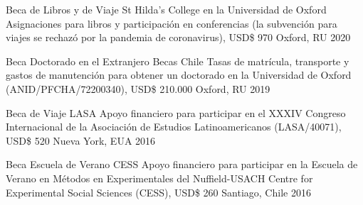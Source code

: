 





\vspace{1mm}

\begin{cvhonors}
\cvhonor
{Beca de Libros y de Viaje St Hilda's College en la Universidad de Oxford} 
{Asignaciones para libros y participación en conferencias (la subvención para viajes se rechazó por la pandemia de coronavirus), USD{\$} 970} 
{Oxford, RU}
{2020}
\end{cvhonors}

\vspace{1mm}

\begin{cvhonors}
\cvhonor
{Beca Doctorado en el Extranjero Becas Chile} 
{Tasas de matrícula, transporte y gastos de manutención para obtener un doctorado en la Universidad de Oxford (ANID/PFCHA/72200340), USD{\$} 210.000}
{Oxford, RU}
{2019}
\end{cvhonors}

\vspace{1mm}

\begin{cvhonors}
\cvhonor
{Beca de Viaje LASA} 
{Apoyo financiero para participar en el XXXIV Congreso Internacional de la Asociación de Estudios Latinoamericanos (LASA/40071), USD{\$} 520}
{Nueva York, EUA}
{2016}
\end{cvhonors}

\vspace{1mm}

\begin{cvhonors}
\cvhonor
{Beca Escuela de Verano CESS}
{Apoyo financiero para participar en la Escuela de Verano en Métodos en Experimentales del Nuffield-USACH Centre for Experimental Social Sciences (CESS), USD{\$} 260}
{Santiago, Chile}
{2016}
\end{cvhonors}

